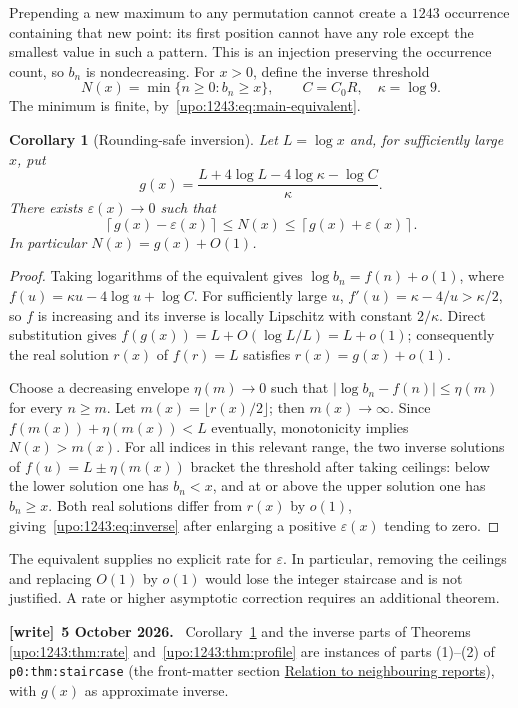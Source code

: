 \documentclass[11pt,letterpaper]{article}
\newtheorem{corollary}[theorem]{Corollary}
\theoremstyle{remark}\newtheorem{remark}[theorem]{Remark}
\numberwithin{equation}{section}
\newenvironment{writenote}[1][]{\par\smallskip\begingroup\small
 \noindent\textbf{[write]}\if\relax\detokenize{#1}\relax\else~\textbf{#1.}\fi\ }%
 {\par\endgroup\smallskip}
\begin{document}
Prepending a new maximum to any permutation cannot create a $1243$
occurrence containing that new point: its first position cannot have
any role except the smallest value in such a pattern. This is an
injection preserving the occurrence count, so $b_n$ is nondecreasing.
For $x>0$, define the inverse threshold
\[
 N(x)=\min\{n\ge0:b_n\ge x\},\qquad C=C_0R,\quad\kappa=\log9.
\]
The minimum is finite, by~\eqref{upo:1243:eq:main-equivalent}.

\begin{corollary}[Rounding-safe inversion]\label{upo:1243:cor:inverse}
Let $L=\log x$ and, for sufficiently large $x$, put
\begin{equation}\label{upo:1243:eq:g}
 g(x)=\frac{L+4\log L-4\log\kappa-\log C}{\kappa}.
\end{equation}
There exists $\varepsilon(x)\to0$ such that
\begin{equation}\label{upo:1243:eq:inverse}
 \left\lceil g(x)-\varepsilon(x)\right\rceil
 \le N(x)\le
 \left\lceil g(x)+\varepsilon(x)\right\rceil.
\end{equation}
In particular $N(x)=g(x)+O(1)$.
\end{corollary}
\begin{proof}
Taking logarithms of the equivalent gives
$\log b_n=f(n)+o(1)$, where
$f(u)=\kappa u-4\log u+\log C$. For sufficiently large $u$,
$f'(u)=\kappa-4/u>\kappa/2$, so $f$ is increasing and its inverse is
locally Lipschitz with constant $2/\kappa$.
Direct substitution gives $f(g(x))=L+O(\log L/L)=L+o(1)$; consequently
the real solution $r(x)$ of $f(r)=L$ satisfies $r(x)=g(x)+o(1)$.

Choose a decreasing envelope $\eta(m)\to0$ such that
$|\log b_n-f(n)|\le\eta(m)$ for every $n\ge m$.
Let $m(x)=\lfloor r(x)/2\rfloor$; then $m(x)\to\infty$.
Since $f(m(x))+\eta(m(x))<L$ eventually, monotonicity implies
$N(x)>m(x)$. For all indices in this relevant range, the two inverse
solutions of $f(u)=L\pm\eta(m(x))$ bracket the threshold after taking
ceilings: below the lower solution one has $b_n<x$, and at or above
the upper solution one has $b_n\ge x$. Both real solutions differ from
$r(x)$ by $o(1)$, giving~\eqref{upo:1243:eq:inverse} after enlarging a positive
$\varepsilon(x)$ tending to zero.
\end{proof}

The equivalent supplies no explicit rate for $\varepsilon$. In
particular, removing the ceilings and replacing $O(1)$ by $o(1)$ would
lose the integer staircase and is not justified. A rate or higher
asymptotic correction requires an additional theorem.
\begin{writenote}[5 October 2026]
Corollary~\ref{upo:1243:cor:inverse} and the inverse parts of Theorems \ref{upo:1243:thm:rate} and~\ref{upo:1243:thm:profile} are instances of parts (1)--(2) of \texttt{p0:thm:staircase} (the front-matter section \hyperref[upo:sec:neighbours]{Relation to neighbouring reports}), with $g(x)$ as approximate inverse.
\end{writenote}
\end{document}
